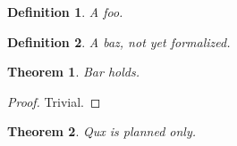 \documentclass{article}
\newtheorem{theorem}{Theorem}
\newtheorem{definition}{Definition}
\begin{document}
\begin{definition}\label{def:foo}
\leanok
A foo.
\end{definition}

\begin{definition}\label{def:baz}
A baz, not yet formalized.
\end{definition}

\begin{theorem}\label{thm:bar}
Bar holds.
\end{theorem}

\begin{proof}
\leanok
{}
Trivial.
\end{proof}

\begin{theorem}\label{thm:qux}
Qux is planned only.
\end{theorem}
\end{document}
